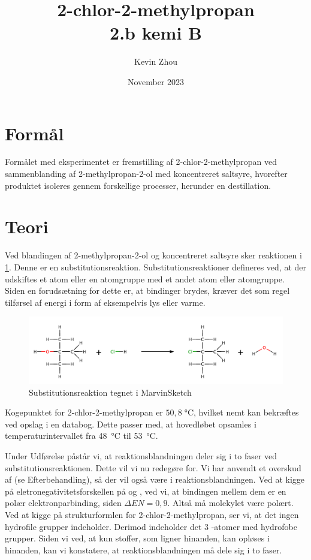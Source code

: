 \documentclass{report}
\title{2-chlor-2-methylpropan\\
{\Large \textbf{2.b kemi B}}}
\author{Kevin Zhou}
\date{November 2023}
\begin{document}
\maketitle
\section*{Formål}%
  \label{sec:Formål}
Formålet med eksperimentet er fremstilling af 2-chlor-2-methylpropan ved sammenblanding af 2-methylpropan-2-ol med koncentreret saltsyre, hvorefter produktet isoleres gennem forskellige processer, herunder en destillation.

\section*{Teori}%
  \label{sec:Teori}
Ved blandingen af 2-methylpropan-2-ol og koncentreret saltsyre sker reaktionen i \cref{fig:subst}.
Denne er en substitutionsreaktion. 
Substitutionsreaktioner defineres ved, at der udskiftes et atom eller en atomgruppe med et andet atom eller atomgruppe. 
Siden en forudsætning for dette er, at bindinger brydes, kræver det som regel tilførsel af energi i form af eksempelvis lys eller varme.
\begin{figure}[H]
\begin{center}
  \includegraphics[scale=0.3]{Subst.png}
\end{center}
\caption{Substitutionsreaktion tegnet i MarvinSketch}
\label{fig:subst}
\end{figure}

Kogepunktet for 2-chlor-2-methylpropan er $50,8 \;\unit{\celsius} $, hvilket nemt kan bekræftes ved opslag i en databog.
Dette passer med, at hovedløbet opsamles i temperaturintervallet fra \qty{48}{\celsius} til \qty{53}{\celsius}.

Under Udførelse påstår vi, at reaktionsblandningen deler sig i to faser ved substitutionsreaktionen.
Dette vil vi nu redegøre for.
Vi har anvendt et overskud af  (se Efterbehandling), så der vil også være  i reaktionsblandningen.
Ved at kigge på eletronegativitetsforskellen på  og , ved vi, at bindingen mellem dem er en polær elektronparbinding, siden $\Delta EN=0,9$.
Altså må molekylet være polært.
Ved at kigge på strukturformlen for 2-chlor-2-methylpropan, ser vi, at det ingen hydrofile grupper indeholder. 
Derimod indeholder det 3 -atomer med hydrofobe grupper.
Siden vi ved, at kun stoffer, som ligner hinanden, kan opløses i hinanden, kan vi konstatere, at reaktionsblandningen må dele sig i to faser.
\end{document}
